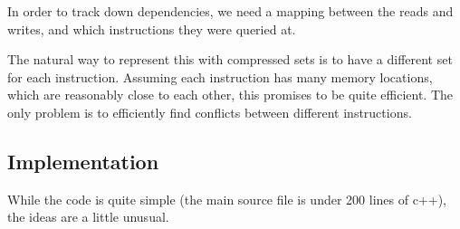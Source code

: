 \documentclass[12pt,twoside]{reedthesis}
\begin{document}
		In order to track down dependencies, we need a mapping between the reads and writes, and which instructions they were queried at.

		The natural way to represent this with compressed sets is to have a different set for each instruction. Assuming each instruction has many memory locations, which are reasonably close to each other, this promises to be quite efficient. The only problem is to efficiently find conflicts between different instructions.

		\subsection{Implementation}

		While the code is quite simple (the main source file is under 200 lines of c++), the ideas are a little unusual.
\end{document}
